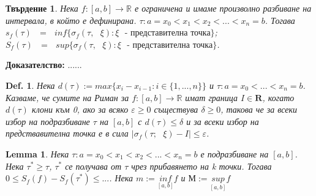 \documentclass[12pt]{article}
\newtheorem{proposition}{Твърдение}
\newtheorem{definition}{Def.}
\newtheorem{lemma}{Lemma}
\newcommand{\spc}{\text{ }}
\begin{document}
	
	
	
	
	
	
	\begin{proposition}
		Нека $f:\left[a, b\right] \rightarrow \mathbb{R}$ е ограничена и имаме произволно разбиване на интервала, в който е дефинирана.
		$\tau : a=x_{0}<x_{1}<x_{2}<...<x_{n}=b$.
		Тогава $s_{f}\left(\tau\right)\spc=\spc inf\{\sigma_{f}\left(\tau,\spc\xi\right) : \xi\spc\text{- представителна точка}\}$;
		$S_{f}\left(\tau\right)\spc=\spc sup\{\sigma_{f}\left(\tau,\spc\xi\right) : \xi\spc\text{- представителна точка}\}$.
	\end{proposition}
	\textbf{Доказателство:} ......
	
	\begin{definition}
		Нека $d\left(\tau\right) := max\{x_{i}-x_{i-1} : i\in\{1,...,n\}\}$ и $\tau : a=x_{0}<...<x_{n}=b$. Казваме, че сумите на Риман за $f: \left[a, b\right] \rightarrow \mathbb{R}$ имат граница $I\in\mathbf{R}$, когато $d\left(\tau\right)$ клони към 0, ако за всяко $\varepsilon\geq 0$ съществува $\delta\geq 0$, такова че за всеки избор на подразбиване $\tau$ на $\left[a, b\right]$ с $d\left(\tau\right)\leq\delta$ и за всеки избор на предствавителна точка е в сила $|\sigma_{f}\left(\tau;\spc\xi\right)-I|\leq\varepsilon$.
	\end{definition}
	
	\begin{lemma}
		Нека $\tau : a=x_{0}<x_{1}<x_{2}<...<x_{n}=b$ е подразбиване на $\left[a, b\right]$. Нека $\tau^{*}\geq\tau$, $\tau^{*}$ се получава от $\tau$ чрез прибавянето на k точки. Тогава $0\leq S_{f}\left(f\right)-S_{f}\left(\tau^{*}\right)\leq...$.
		Нека $m := \underset{\left[a, b\right]}{inf} f$ и $М := \underset{\left[a, b\right]}{sup} f$
	\end{lemma}
\end{document}
